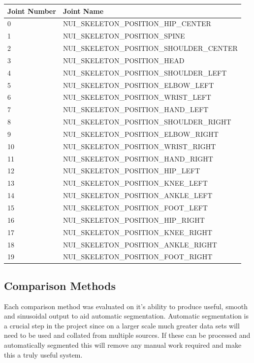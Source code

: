 \begin{center}
    \begin{tabular}{| l | l |}
    \hline
    Joint Number & Joint Name \\ \hline
    0 & NUI_SKELETON_POSITION_HIP_CENTER \\ \hline
    1 & NUI_SKELETON_POSITION_SPINE\\ \hline
    2 & NUI_SKELETON_POSITION_SHOULDER_CENTER\\ \hline
    3 & NUI_SKELETON_POSITION_HEAD\\ \hline
    4 & NUI_SKELETON_POSITION_SHOULDER_LEFT\\ \hline
    5 & NUI_SKELETON_POSITION_ELBOW_LEFT\\ \hline
    6 & NUI_SKELETON_POSITION_WRIST_LEFT\\ \hline
    7 & NUI_SKELETON_POSITION_HAND_LEFT\\ \hline
    8 & NUI_SKELETON_POSITION_SHOULDER_RIGHT\\ \hline
    9 & NUI_SKELETON_POSITION_ELBOW_RIGHT\\ \hline
    10 & NUI_SKELETON_POSITION_WRIST_RIGHT\\ \hline
    11 & NUI_SKELETON_POSITION_HAND_RIGHT\\ \hline
    12 & NUI_SKELETON_POSITION_HIP_LEFT\\ \hline
    13 & NUI_SKELETON_POSITION_KNEE_LEFT\\ \hline
    14 & NUI_SKELETON_POSITION_ANKLE_LEFT\\ \hline
    15 & NUI_SKELETON_POSITION_FOOT_LEFT\\ \hline
    16 & NUI_SKELETON_POSITION_HIP_RIGHT\\ \hline
    17 & NUI_SKELETON_POSITION_KNEE_RIGHT\\ \hline
    18 & NUI_SKELETON_POSITION_ANKLE_RIGHT\\ \hline
    19 & NUI_SKELETON_POSITION_FOOT_RIGHT\\ \hline
    \hline
    \end{tabular}
\end{center}

\subsection{Comparison Methods}
Each comparison method was evaluated on it's ability to produce useful, smooth and sinusoidal output to aid automatic segmentation. Automatic segmentation is a crucial step in the project since on a larger scale much greater data sets will need to be used and collated from multiple sources. If these can be processed and automatically segmented this will remove any manual work required and make this a truly useful system.

